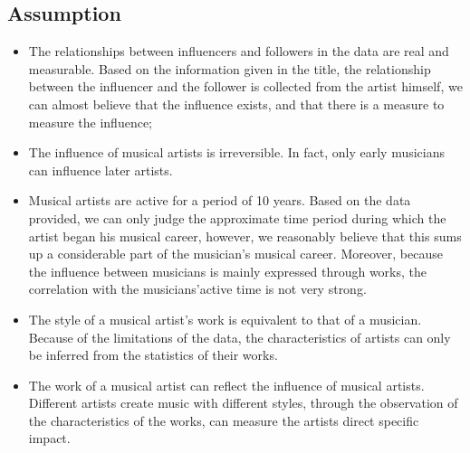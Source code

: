 \documentclass[conference]{IEEEtran}
\begin{document}
\subsection{Assumption}
\begin{itemize}
	\item The relationships between influencers and followers in the data are real and measurable. Based on the information given in the title, the relationship between the influencer and the follower is collected from the artist himself, we can almost believe that the influence exists, and that there is a measure to measure the influence;
	
	\item The influence of musical artists is irreversible. In fact, only early musicians can influence later artists.
	
	\item Musical artists are active for a period of 10 years. Based on the data provided, we can only judge the approximate time period during which the artist began his musical career, however, we reasonably believe that this sums up a considerable part of the musician’s musical career. Moreover, because the influence between musicians is mainly expressed through works, the correlation with the musicians’active time is not very strong.
	
	\item The style of a musical artist’s work is equivalent to that of a musician. Because of the limitations of the data, the characteristics of artists can only be inferred from the statistics of their works.
	
	\item The work of a musical artist can reflect the influence of musical artists. Different artists create music with different styles, through the observation of the characteristics of the works, can measure the artists direct specific impact.
	
\end{itemize}
\end{document}
